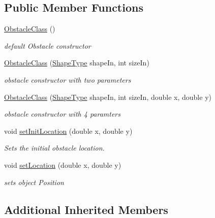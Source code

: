 \subsection*{Public Member Functions}
\begin{DoxyCompactItemize}
\item 
\hyperlink{classObstacleClass_a7fa2d44335187a92e7a175e70963afd1}{Obstacle\-Class} ()
\begin{DoxyCompactList}\small\item\em default Obstacle constructor \end{DoxyCompactList}\item 
\hyperlink{classObstacleClass_aff7cabe763e79d642912d7f95a681a52}{Obstacle\-Class} (\hyperlink{PhysicalObjectClass_8h_a5a4538eeab397888d88a4eefcc5a1345}{Shape\-Type} shape\-In, int size\-In)
\begin{DoxyCompactList}\small\item\em obstacle constructor with two parameters \end{DoxyCompactList}\item 
\hyperlink{classObstacleClass_a019600b458c09a3190d637638fd24e8d}{Obstacle\-Class} (\hyperlink{PhysicalObjectClass_8h_a5a4538eeab397888d88a4eefcc5a1345}{Shape\-Type} shape\-In, int size\-In, double x, double y)
\begin{DoxyCompactList}\small\item\em obstacle constructor with 4 paramters \end{DoxyCompactList}\item 
void \hyperlink{classObstacleClass_a7441fc7bc4c504dad86558b4f4314443}{set\-Init\-Location} (double x, double y)
\begin{DoxyCompactList}\small\item\em Sets the initial obstacle location. \end{DoxyCompactList}\item 
void \hyperlink{classObstacleClass_ab405faf368836ef45a42fb4f7084631e}{set\-Location} (double x, double y)
\begin{DoxyCompactList}\small\item\em sets object Position \end{DoxyCompactList}\end{DoxyCompactItemize}
\subsection*{Additional Inherited Members}


